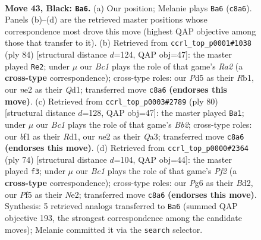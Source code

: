 \documentclass[11pt]{article}
\begin{document}
\clearpage

\begin{figure}[p]\centering
\begin{subfigure}{0.46\textwidth}\centering
\resizebox{\linewidth}{!}{%
\newchessgame
\chessboard[
  setfen={2b4r/p2r1k1p/1q1b2pP/1p1p1pP1/1n1P1P2/1P2P2K/4N3/R2Q1BNR b - - 33 43},
  showmover=false,
  pgfstyle=straightmove, color=movearrow, markmove={c8-a6}
]}
\caption{}
\end{subfigure}\hfill
\begin{subfigure}{0.46\textwidth}\centering
\resizebox{\linewidth}{!}{%
\newchessgame
\chessboard[
  setfen={2r1r1kb/ppqnpp1p/3p1npP/3P4/1P2PP2/N4BP1/R4BK1/1R1Q4 w - - 11 43},
  showmover=false,
  pgfstyle=straightmove, color=movearrow, markmove={a2-e2}
]}
\caption{}
\end{subfigure}
\\[4pt]
\begin{subfigure}{0.46\textwidth}\centering
\resizebox{\linewidth}{!}{%
\newchessgame
\chessboard[
  setfen={3rr1k1/1bqn1pp1/1p2pn2/p6p/P1PP3P/Q3NPPB/1B1R1K2/3R4 w - - 15 41},
  showmover=false,
  pgfstyle=straightmove, color=movearrow, markmove={b2-a1}
]}
\caption{}
\end{subfigure}\hfill
\begin{subfigure}{0.46\textwidth}\centering
\resizebox{\linewidth}{!}{%
\newchessgame
\chessboard[
  setfen={4q1k1/4n1p1/r3ppn1/1p1b3p/2pP3P/2P4Q/1P1BNPP1/1B2R1K1 w - - 19 38},
  showmover=false,
  pgfstyle=straightmove, color=movearrow, markmove={f2-f3}
]}
\caption{}
\end{subfigure}
\caption{\textbf{Move 43, Black: \texttt{Ba6}.} (a) Our position; Melanie plays \texttt{Ba6} (\texttt{c8a6}). Panels (b)--(d) are the retrieved master positions whose correspondence most drove this move (highest QAP objective among those that transfer to it). (b) Retrieved from \texttt{ccrl\_top\_p0001\#1038} (ply 84) [structural distance $d$=124, QAP obj=47]: the master played \texttt{Re2}; under $\mu$ our \emph{Bc1} plays the role of that game's \emph{Ra2} (a \textbf{cross-type} correspondence); cross-type roles: our \emph{P}d5 as their \emph{R}b1, our \emph{n}e2 as their \emph{Q}d1; transferred move \texttt{c8a6} \textbf{(endorses this move)}. (c) Retrieved from \texttt{ccrl\_top\_p0003\#2789} (ply 80) [structural distance $d$=128, QAP obj=47]: the master played \texttt{Ba1}; under $\mu$ our \emph{Bc1} plays the role of that game's \emph{Bb2}; cross-type roles: our \emph{b}f1 as their \emph{R}d1, our \emph{n}e2 as their \emph{Q}a3; transferred move \texttt{c8a6} \textbf{(endorses this move)}. (d) Retrieved from \texttt{ccrl\_top\_p0000\#2364} (ply 74) [structural distance $d$=104, QAP obj=44]: the master played \texttt{f3}; under $\mu$ our \emph{Bc1} plays the role of that game's \emph{Pf2} (a \textbf{cross-type} correspondence); cross-type roles: our \emph{P}g6 as their \emph{B}d2, our \emph{P}f5 as their \emph{N}e2; transferred move \texttt{c8a6} \textbf{(endorses this move)}. Synthesis: 5 retrieved analogs transferred to \texttt{Ba6} (summed QAP objective 193, the strongest correspondence among the candidate moves); Melanie committed it via the \texttt{search} selector.}
\label{fig:thought-m85}
\end{figure}
\end{document}
